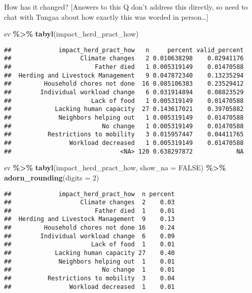 \documentclass[
]{article}
\newenvironment{Shaded}{\begin{snugshade}}{\end{snugshade}}
\newcommand{\AttributeTok}[1]{\textcolor[rgb]{0.13,0.29,0.53}{#1}}
\newcommand{\ConstantTok}[1]{\textcolor[rgb]{0.56,0.35,0.01}{#1}}
\newcommand{\DecValTok}[1]{\textcolor[rgb]{0.00,0.00,0.81}{#1}}
\newcommand{\FunctionTok}[1]{\textcolor[rgb]{0.13,0.29,0.53}{\textbf{#1}}}
\newcommand{\NormalTok}[1]{#1}
\newcommand{\SpecialCharTok}[1]{\textcolor[rgb]{0.81,0.36,0.00}{\textbf{#1}}}
\begin{document}
How has it changed? {[}Answers to this Q don't address this directly, so
need to chat with Tungaa about how exactly this was worded in
person\ldots{]}

\begin{Shaded}
\begin{Highlighting}[]
\NormalTok{sv }\SpecialCharTok{\%\textgreater{}\%} \FunctionTok{tabyl}\NormalTok{(impact\_herd\_pract\_how) }
\end{Highlighting}
\end{Shaded}

\begin{verbatim}
##             impact_herd_pract_how   n     percent valid_percent
##                   Climate changes   2 0.010638298    0.02941176
##                       Father died   1 0.005319149    0.01470588
##  Herding and Livestock Management   9 0.047872340    0.13235294
##         Household chores not done  16 0.085106383    0.23529412
##        Individual workload change   6 0.031914894    0.08823529
##                      Lack of food   1 0.005319149    0.01470588
##            Lacking human capacity  27 0.143617021    0.39705882
##             Neighbors helping out   1 0.005319149    0.01470588
##                         No change   1 0.005319149    0.01470588
##          Restrictions to mobility   3 0.015957447    0.04411765
##                Workload decreased   1 0.005319149    0.01470588
##                              <NA> 120 0.638297872            NA
\end{verbatim}

\begin{Shaded}
\begin{Highlighting}[]
\NormalTok{sv }\SpecialCharTok{\%\textgreater{}\%} \FunctionTok{tabyl}\NormalTok{(impact\_herd\_pract\_how, }\AttributeTok{show\_na =} \ConstantTok{FALSE}\NormalTok{) }\SpecialCharTok{\%\textgreater{}\%}
  \FunctionTok{adorn\_rounding}\NormalTok{(}\AttributeTok{digits =} \DecValTok{2}\NormalTok{)}
\end{Highlighting}
\end{Shaded}

\begin{verbatim}
##             impact_herd_pract_how  n percent
##                   Climate changes  2    0.03
##                       Father died  1    0.01
##  Herding and Livestock Management  9    0.13
##         Household chores not done 16    0.24
##        Individual workload change  6    0.09
##                      Lack of food  1    0.01
##            Lacking human capacity 27    0.40
##             Neighbors helping out  1    0.01
##                         No change  1    0.01
##          Restrictions to mobility  3    0.04
##                Workload decreased  1    0.01
\end{verbatim}
\end{document}
